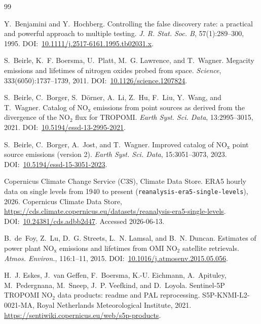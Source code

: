 \documentclass[11pt,a4paper]{article}
\providecommand{\doi}[1]{DOI:~\href{https://doi.org/#1}{#1}}
\providecommand{\ce}[1]{\ensuremath{\mathrm{#1}}}
\begin{document}
\begin{thebibliography}{99}
\setlength{\itemsep}{0.15em}

Y.~Benjamini and Y.~Hochberg.
\newblock Controlling the false discovery rate: a practical and powerful approach to multiple
testing.
\newblock \emph{J. R. Stat. Soc. B}, 57(1):289--300, 1995.
\newblock \doi{10.1111/j.2517-6161.1995.tb02031.x}.

S.~Beirle, K.~F. Boersma, U.~Platt, M.~G. Lawrence, and T.~Wagner.
\newblock Megacity emissions and lifetimes of nitrogen oxides probed from space.
\newblock \emph{Science}, 333(6050):1737--1739, 2011.
\newblock \doi{10.1126/science.1207824}.

S.~Beirle, C.~Borger, S.~Dörner, A.~Li, Z.~Hu, F.~Liu, Y.~Wang, and T.~Wagner.
\newblock Catalog of \ce{NO_x} emissions from point sources as derived from the divergence of the
\ce{NO_2} flux for TROPOMI.
\newblock \emph{Earth Syst. Sci. Data}, 13:2995--3015, 2021.
\newblock \doi{10.5194/essd-13-2995-2021}.

S.~Beirle, C.~Borger, A.~Jost, and T.~Wagner.
\newblock Improved catalog of \ce{NO_x} point source emissions (version 2).
\newblock \emph{Earth Syst. Sci. Data}, 15:3051--3073, 2023.
\newblock \doi{10.5194/essd-15-3051-2023}.

Copernicus Climate Change Service (C3S), Climate Data Store.
\newblock ERA5 hourly data on single levels from 1940 to present
(\texttt{reanalysis-era5-single-levels}), 2026.
\newblock Copernicus Climate Data Store, \url{https://cds.climate.copernicus.eu/datasets/reanalysis-era5-single-levels}.
\newblock \doi{10.24381/cds.adbb2d47}. Accessed 2026-06-13.

B.~de~Foy, Z.~Lu, D.~G. Streets, L.~N. Lamsal, and B.~N. Duncan.
\newblock Estimates of power plant \ce{NO_x} emissions and lifetimes from OMI \ce{NO_2} satellite
retrievals.
\newblock \emph{Atmos. Environ.}, 116:1--11, 2015.
\newblock \doi{10.1016/j.atmosenv.2015.05.056}.

H.~J. Eskes, J.~van Geffen, F.~Boersma, K.-U. Eichmann, A.~Apituley, M.~Pedergnana, M.~Sneep,
J.~P. Veefkind, and D.~Loyola.
\newblock Sentinel-5P TROPOMI \ce{NO_2} data products: readme and PAL reprocessing.
\newblock S5P-KNMI-L2-0021-MA, Royal Netherlands Meteorological Institute, 2021.
\newblock \url{https://sentiwiki.copernicus.eu/web/s5p-products}.


\end{thebibliography}
\end{document}
